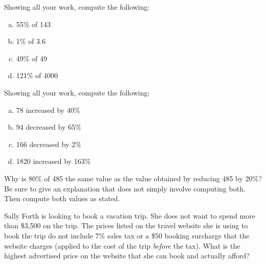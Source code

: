 \documentclass[11pt,letterpaper]{article}
\begin{document}

 Showing all your work, compute the following:
	\begin{enumerate}[(a)]
	\item 55\% of 143
	\item 1\% of 3.6
	\item 49\% of 49
	\item 121\% of 4000
	\end{enumerate}



\newpage



 Showing all your work, compute the following:
	\begin{enumerate}[(a)]
	\item 78 increased by 40\%
	\item 94 decreased by 65\%
	\item 166 decreased by 2\%
	\item 1820 increased by 163\%
	\end{enumerate}



\newpage



 Why is 80\% of 485 the same value as the value obtained by reducing 485 by 20\%? Be sure to give an explanation that does not simply involve computing both. Then compute both values as stated. 



\newpage



 Sally Forth is looking to book a vacation trip. She does not want to spend more than \$3,500 on the trip. The prices listed on the travel website she is using to book the trip do not include 7\% sales tax or a \$50 booking surcharge that the website charges (applied to the cost of the trip \textit{before} the tax). What is the highest advertised price on the website that she can book and actually afford? \pspace



\newpage
\end{document}
